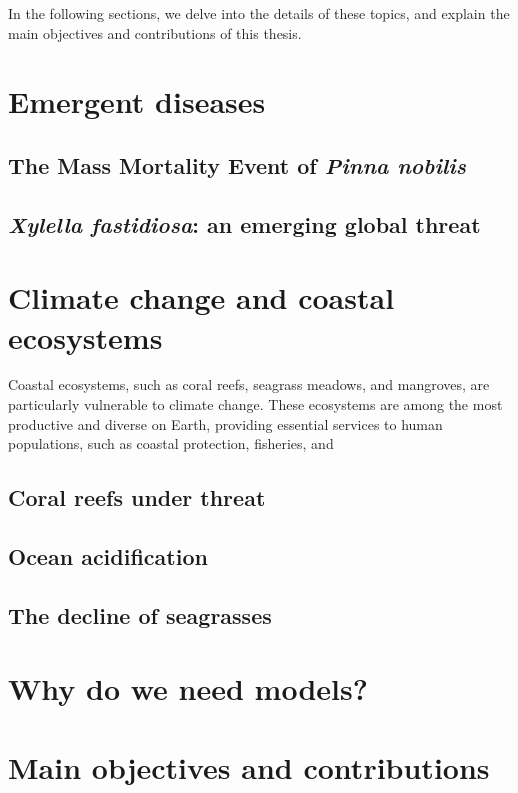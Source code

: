 In the following sections, we delve into the details of these
topics, and explain the main objectives and contributions of this thesis.

\section{\label{sec:Emergent diseases} Emergent diseases}

\subsection{\label{sec:The Mass Mortality Event of Pinna nobilis} The Mass
  Mortality Event of \textit{Pinna nobilis}}

\subsection{\label{sec:Xylella fastidiosa: an emerging global
    threat}\textit{Xylella
    fastidiosa}: an emerging global threat}

\section{\label{sec:Climate change and coastal ecosystems} Climate change and
  coastal ecosystems}

Coastal ecosystems, such as coral reefs, seagrass meadows, and mangroves, are
particularly vulnerable to climate change. These ecosystems
are among the most productive and diverse on Earth, providing essential
services to human populations, such as coastal protection, fisheries, and

\subsection{\label{sec:Coral reefs under threat} Coral reefs under threat}

\subsection{\label{sec:Ocean acidification} Ocean acidification}

\subsection{\label{sec:The decline of seagrasses} The decline of seagrasses}

\section{\label{sec:Why do we need models?} Why do we need models?}

\section{\label{sec:Main objectives and contributions} Main objectives and
  contributions}